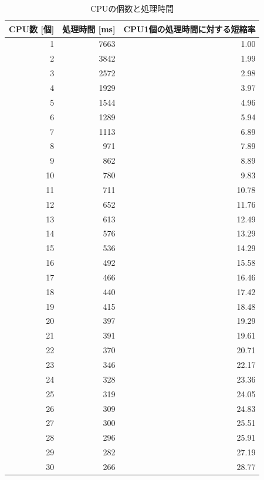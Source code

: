 \documentclass[a4j,titlepage]{jsarticle}
\newcommand{\chuo}[1]{\multicolumn{1}{|c|}{#1}}
\begin{document}
\begin{table}[H]
  \centering
  \caption{CPUの個数と処理時間}
  \label{tb:kadai2}

  \begin{tabular}{|r|r|r|}
    \hline
    \chuo{CPU数 [個]} & \chuo{処理時間 [ms]} & \chuo{CPU1個の処理時間に対する短縮率} \\ \hline \hline
     1 & 7663 &  1.00 \\ \hline
     2 & 3842 &  1.99 \\ \hline
     3 & 2572 &  2.98 \\ \hline
     4 & 1929 &  3.97 \\ \hline
     5 & 1544 &  4.96 \\ \hline
     6 & 1289 &  5.94 \\ \hline
     7 & 1113 &  6.89 \\ \hline
     8 &  971 &  7.89 \\ \hline
     9 &  862 &  8.89 \\ \hline
    10 &  780 &  9.83 \\ \hline
    11 &  711 & 10.78 \\ \hline
    12 &  652 & 11.76 \\ \hline
    13 &  613 & 12.49 \\ \hline
    14 &  576 & 13.29 \\ \hline
    15 &  536 & 14.29 \\ \hline
    16 &  492 & 15.58 \\ \hline
    17 &  466 & 16.46 \\ \hline
    18 &  440 & 17.42 \\ \hline
    19 &  415 & 18.48 \\ \hline
    20 &  397 & 19.29 \\ \hline
    21 &  391 & 19.61 \\ \hline
    22 &  370 & 20.71 \\ \hline
    23 &  346 & 22.17 \\ \hline
    24 &  328 & 23.36 \\ \hline
    25 &  319 & 24.05 \\ \hline
    26 &  309 & 24.83 \\ \hline
    27 &  300 & 25.51 \\ \hline
    28 &  296 & 25.91 \\ \hline
    29 &  282 & 27.19 \\ \hline
    30 &  266 & 28.77 \\ \hline
  \end{tabular}
\end{table}
\end{document}

